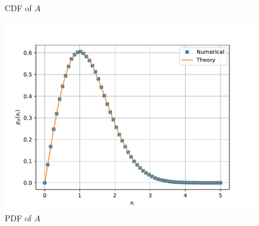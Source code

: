\documentclass[journal,8pt,onecolumn]{IEEEtran}
\begin{document}
\begin{enumerate}
\begin{figure}[H]
\caption{CDF of $A$}
\label{fig:rayleigh_cdf}
\end{figure}
\begin{figure}[H]
\centering
\includegraphics[width=\columnwidth/2]{./figs/rayleigh_pdf.pdf}
\caption{PDF of $A$}
\label{fig:rayleigh_pdf}
\end{figure}
%


\end{enumerate}
\end{document}
